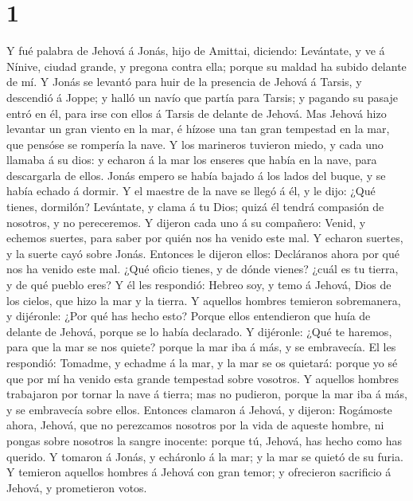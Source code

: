 \hypertarget{section}{%
\section{1}\label{section}}

 Y fué palabra de Jehová á Jonás, hijo de Amittai,
diciendo:  Levántate, y ve á Nínive, ciudad grande, y
pregona contra ella; porque su maldad ha subido delante de mí.
 Y Jonás se levantó para huir de la presencia de Jehová á
Tarsis, y descendió á Joppe; y halló un navío que partía para Tarsis; y
pagando su pasaje entró en él, para irse con ellos á Tarsis de delante
de Jehová.  Mas Jehová hizo levantar un gran viento en la
mar, é hízose una tan gran tempestad en la mar, que pensóse se rompería
la nave.  Y los marineros tuvieron miedo, y cada uno
llamaba á su dios: y echaron á la mar los enseres que había en la nave,
para descargarla de ellos. Jonás empero se había bajado á los lados del
buque, y se había echado á dormir.  Y el maestre de la
nave se llegó á él, y le dijo: ¿Qué tienes, dormilón? Levántate, y clama
á tu Dios; quizá él tendrá compasión de nosotros, y no pereceremos.
 Y dijeron cada uno á su compañero: Venid, y echemos
suertes, para saber por quién nos ha venido este mal. Y echaron suertes,
y la suerte cayó sobre Jonás.  Entonces le dijeron ellos:
Decláranos ahora por qué nos ha venido este mal. ¿Qué oficio tienes, y
de dónde vienes? ¿cuál es tu tierra, y de qué pueblo eres?
 Y él les respondió: Hebreo soy, y temo á Jehová, Dios de
los cielos, que hizo la mar y la tierra.  Y aquellos
hombres temieron sobremanera, y dijéronle: ¿Por qué has hecho esto?
Porque ellos entendieron que huía de delante de Jehová, porque se lo
había declarado.  Y dijéronle: ¿Qué te haremos, para que
la mar se nos quiete? porque la mar iba á más, y se embravecía.
 El les respondió: Tomadme, y echadme á la mar, y la mar
se os quietará: porque yo sé que por mí ha venido esta grande tempestad
sobre vosotros.  Y aquellos hombres trabajaron por tornar
la nave á tierra; mas no pudieron, porque la mar iba á más, y se
embravecía sobre ellos.  Entonces clamaron á Jehová, y
dijeron: Rogámoste ahora, Jehová, que no perezcamos nosotros por la vida
de aqueste hombre, ni pongas sobre nosotros la sangre inocente: porque
tú, Jehová, has hecho como has querido.  Y tomaron á
Jonás, y echáronlo á la mar; y la mar se quietó de su furia.
 Y temieron aquellos hombres á Jehová con gran temor; y
ofrecieron sacrificio á Jehová, y prometieron votos. 

